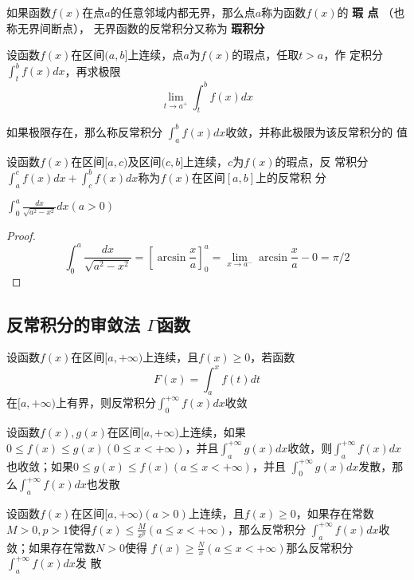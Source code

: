 \documentclass[11pt]{article}
\begin{document}
如果函数\(f(x)\)在点\(a\)的任意邻域内都无界，那么点\(a\)称为函数\(f(x)\)的 \textbf{瑕
点}  （也称无界间断点）， 无界函数的反常积分又称为 \textbf{瑕积分}

设函数\(f(x)\)在区间\((a,b]\)上连续，点\(a\)为\(f(x)\)的瑕点，任取\(t>a\)，作
定积分\(\int_t^bf(x)dx\)，再求极限
\begin{equation*}
\lim_{t\to a^+}\int^b_tf(x)dx
\end{equation*}

\begin{definition}[]
如果极限存在，那么称反常积分 \(\int_a^bf(x)dx\)收敛，并称此极限为该反常积分的
值
\end{definition}

设函数\(f(x)\)在区间\([a,c)\)及区间\((c,b]\)上连续，\(c\)为\(f(x)\)的瑕点，反
常积分\(\int_a^cf(x)dx+\int_c^bf(x)dx\)称为\(f(x)\)在区间\([a,b]\)上的反常积
分

\begin{proposition}[]
\(\int_0^a\frac{dx}{\sqrt{a^2-x^2}}dx(a>0)\)
\end{proposition}

\begin{proof}
\begin{equation*}
\int_0^a\frac{dx}{\sqrt{a^2-x^2}}=[\arcsin\frac{x}{a}]^a_0=\lim_{x\to a^-}
\arcsin \frac{x}{a}-0=\pi/2
\end{equation*}
\end{proof}
\subsection{反常积分的审敛法 \(Γ\)函数}
\label{sec:org6f61aed}
\begin{theorem}[]
设函数\(f(x)\)在区间\([a,+\infty)\)上连续，且\(f(x)\ge0\)，若函数
\begin{equation*}
F(x)=\int_a^xf(t)dt
\end{equation*}
在\([a,+\infty)\)上有界，则反常积分\(\int_0^{+\infty}f(x)dx\)收敛
\end{theorem}

\begin{theorem}[比较审敛原理]
设函数\(f(x),g(x)\)在区间\([a,+\infty)\)上连续，如果\(0\le f(x)\le g(x)(0\le
   x<+\infty)\)，并且\(\int_a^{+\infty}g(x)dx\)收敛，则\(\int_a^{+\infty}f(x)dx\)
也收敛；如果\(0\le g(x)\le f(x)(a\le x<+\infty)\)，并且
\(\int_0^{+\infty}g(x)dx\)发散，那么\(\int_a^{+\infty}f(x)dx\)也发散
\end{theorem}

\begin{theorem}[比较审敛法 1]
设函数\(f(x)\)在区间\([a,+\infty)(a>0)\)上连续，且\(f(x)\ge0\)，如果存在常数
\(M>0,p>1\)使得\(f(x)\le\frac{M}{x^p}(a\le x<+\infty)\)，那么反常积分
\(\int_a^{+\infty}f(x)dx\)收敛；如果存在常数\(N>0\)使得
\(f(x)\ge\frac{N}{x}(a\le x<+\infty)\)那么反常积分\(\int_a^{+\infty}f(x)dx\)发
散
\end{theorem}
\end{document}
